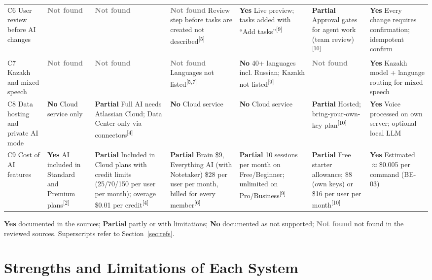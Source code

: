 \documentclass[11pt,a4paper]{article}
\newcommand{\src}[1]{\textsuperscript{[#1]}}
\newcommand{\yes}{\textcolor{green!45!black}{\textbf{Yes}}}
\newcommand{\prt}{\textcolor{orange!80!black}{\textbf{Partial}}}
\newcommand{\no}{\textcolor{red!65!black}{\textbf{No}}}
\newcommand{\nd}{\textcolor{gray}{\textbf{Not found}}}
\begin{document}
\begin{landscape}
{\begin{xltabular}{\linewidth}{P{2.7cm} L L L L L L}
C6 User review before AI changes & \nd{} & \nd{} & \nd{} Review step before tasks are created not described\src{5} & \yes{} Live preview; tasks added with ``Add tasks''\src{9} & \prt{} Approval gates for agent work (team review)\src{10} & \yes{} Every change requires confirmation; idempotent confirm \\
C7 Kazakh and mixed speech & \nd{} & \nd{} & \nd{} Languages not listed\src{5,7} & \no{} 40+ languages incl. Russian; Kazakh not listed\src{9} & \nd{} & \yes{} Kazakh model + language routing for mixed speech \\
C8 Data hosting and private AI mode & \no{} Cloud service only & \prt{} Full AI needs Atlassian Cloud; Data Center only via connectors\src{4} & \no{} Cloud service & \no{} Cloud service & \prt{} Hosted; bring-your-own-key plan\src{10} & \yes{} Voice processed on own server; optional local LLM \\
C9 Cost of AI features & \yes{} AI included in Standard and Premium plans\src{2} & \prt{} Included in Cloud plans with credit limits (25/70/150 per user per month); overage \$0.01 per credit\src{4} & \prt{} Brain \$9, Everything AI (with Notetaker) \$28 per user per month, billed for every member\src{6} & \prt{} 10 sessions per month on Free/Beginner; unlimited on Pro/Business\src{9} & \prt{} Free starter allowance; \$8 (own keys) or \$16 per user per month\src{10} & \yes{} Estimated $\approx$\$0.005 per command (BE-03) \\
\bottomrule
\end{xltabular}}

{\footnotesize \yes{} documented in the sources; \prt{} partly or with limitations; \no{} documented as not supported; \nd{} not found in the reviewed sources. Superscripts refer to Section~\ref{sec:refs}.}
\end{landscape}

\section{Strengths and Limitations of Each System}
\end{document}
